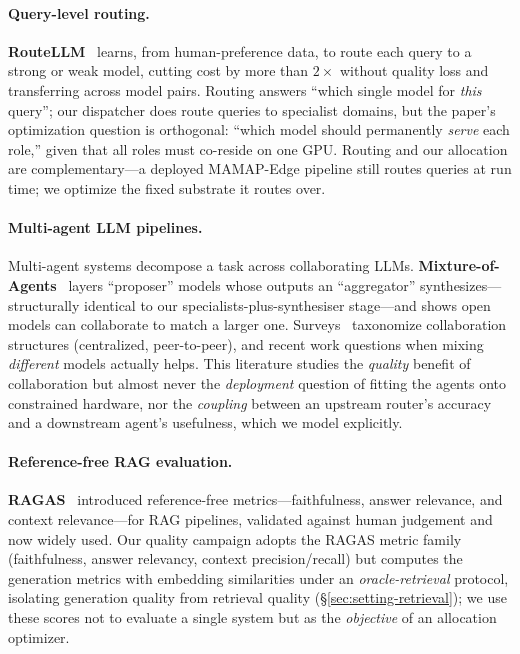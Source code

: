 \documentclass[11pt]{article}
\begin{document}
\paragraph{Query-level routing.}
\textbf{RouteLLM}~\cite{routellm} learns, from human-preference data, to route each
query to a strong or weak model, cutting cost by more than $2\times$ without quality
loss and transferring across model pairs. Routing answers ``which single model for
\emph{this} query''; our dispatcher does route queries to specialist domains, but
the paper's optimization question is orthogonal: ``which model should permanently
\emph{serve} each role,'' given that all roles must co-reside on one GPU. Routing
and our allocation are complementary---a deployed MAMAP-Edge pipeline still routes
queries at run time; we optimize the fixed substrate it routes over.

\paragraph{Multi-agent LLM pipelines.}
Multi-agent systems decompose a task across collaborating LLMs. \textbf{Mixture-of-Agents}~\cite{moa}
layers ``proposer'' models whose outputs an ``aggregator'' synthesizes---structurally
identical to our specialists-plus-synthesiser stage---and shows open models can
collaborate to match a larger one. Surveys~\cite{masurvey} taxonomize collaboration
structures (centralized, peer-to-peer), and recent work questions when mixing
\emph{different} models actually helps. This literature studies the \emph{quality}
benefit of collaboration but almost never the \emph{deployment} question of fitting
the agents onto constrained hardware, nor the \emph{coupling} between an upstream
router's accuracy and a downstream agent's usefulness, which we model explicitly.

\paragraph{Reference-free RAG evaluation.}
\textbf{RAGAS}~\cite{ragas} introduced reference-free metrics---faithfulness,
answer relevance, and context relevance---for RAG pipelines, validated against
human judgement and now widely used. Our quality campaign adopts the RAGAS metric
family (faithfulness, answer relevancy, context precision/recall) but computes the
generation metrics with embedding similarities under an \emph{oracle-retrieval}
protocol, isolating generation quality from retrieval quality
(§\ref{sec:setting-retrieval}); we use these scores not to evaluate a single system
but as the \emph{objective} of an allocation optimizer.
\end{document}
